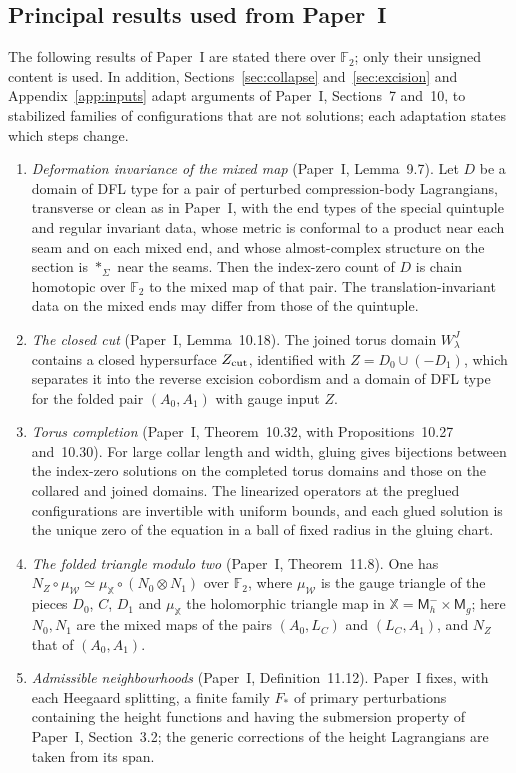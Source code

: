 \documentclass[11pt]{amsart}
\theoremstyle{definition}
\theoremstyle{remark}
\theoremstyle{plain}
\numberwithin{equation}{section}
\newcommand{\FF}{\mathbb F_2}
\newcommand{\Msf}{\mathsf M}
\begin{document}
\subsection{Principal results used from Paper~I}\label{subsec:paperI-results}
The following results of Paper~I are stated there over $\FF$; only their unsigned content is used.
In addition, Sections~\ref{sec:collapse} and~\ref{sec:excision} and Appendix~\ref{app:inputs}
adapt arguments of Paper~I, Sections~7 and~10, to stabilized families of configurations that are
not solutions; each adaptation states which steps change.
\begin{enumerate}[label=(I\arabic*),ref=(I\arabic*)]
\item\label{I1} \emph{Deformation invariance of the mixed map} (Paper~I, Lemma~9.7). Let $D$ be a domain of DFL type for a pair of perturbed compression-body Lagrangians, transverse or clean as in Paper~I, with the end types of the special quintuple
and regular invariant data, whose metric is conformal to a product near each seam and on each mixed
end, and whose almost-complex structure on the section is $*_\Sigma$ near the seams. Then the
index-zero count of $D$ is chain homotopic over $\FF$ to the mixed map of that pair. The
translation-invariant data on the mixed ends may differ from those of the quintuple.
\item\label{I2} \emph{The closed cut} (Paper~I, Lemma~10.18). The joined torus domain $W^J_\lambda$
contains a closed hypersurface $Z_{\rm cut}$, identified with $Z=D_0\cup(-D_1)$, which separates it
into the reverse excision cobordism and a domain of DFL type for the folded pair $(A_0,A_1)$ with
gauge input $Z$.
\item\label{I3} \emph{Torus completion} (Paper~I, Theorem~10.32, with Propositions~10.27
and~10.30). For large collar length and width, gluing gives bijections between the index-zero
solutions on the completed torus domains and those on the collared and joined domains. The
linearized operators at the preglued configurations are invertible with uniform bounds, and each
glued solution is the unique zero of the equation in a ball of fixed radius in the gluing chart.
\item\label{I4} \emph{The folded triangle modulo two} (Paper~I, Theorem~11.8). One has
$N_Z\circ\mu_{\mathscr W}\simeq\mu_{\mathbb X}\circ(N_0\otimes N_1)$ over $\FF$, where
$\mu_{\mathscr W}$ is the gauge triangle of the pieces $D_0$, $C$, $D_1$ and $\mu_{\mathbb X}$ the
holomorphic triangle map in $\mathbb X=\Msf_h^-\times\Msf_g$; here $N_0,N_1$ are the mixed maps of the pairs $(A_0,L_C)$ and $(L_C,A_1)$, and $N_Z$ that of $(A_0,A_1)$.
\item\label{I5} \emph{Admissible neighbourhoods} (Paper~I, Definition~11.12). Paper~I fixes, with
each Heegaard splitting, a finite family $F_*$ of primary perturbations containing the height
functions and having the submersion property of Paper~I, Section~3.2; the generic corrections
of the height Lagrangians are taken from its span.


\end{enumerate}
\end{document}
